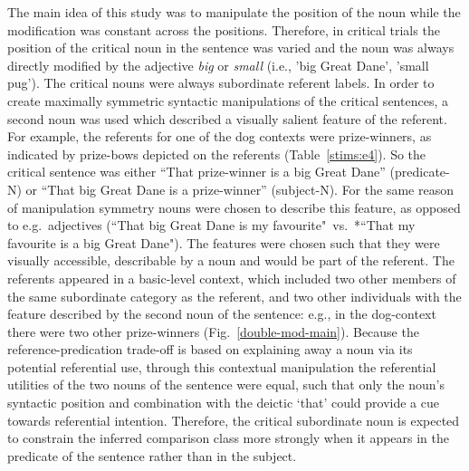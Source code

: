 The main idea of this study was to manipulate the position of the noun while the modification was constant across the positions. Therefore, in critical trials the position of the critical noun in the sentence was varied and the noun was always directly modified by the adjective \textit{big} or \textit{small} (i.e., 'big Great Dane', 'small pug'). The critical nouns were always subordinate referent labels. In order to create maximally symmetric syntactic manipulations of the critical sentences, a second noun was used which described a visually salient feature of the referent. For example, the referents for one of the dog contexts were prize-winners, as indicated by prize-bows depicted on the referents (Table~\ref{stims:e4}). So the critical sentence was either “That prize-winner is a big Great Dane” (predicate-N) or “That big Great Dane is a prize-winner” (subject-N). For the same reason of manipulation symmetry nouns were chosen to describe this feature, as opposed to e.g.~adjectives (``That big Great Dane is my favourite"~vs.~*``That my favourite is a big Great Dane"). The features were chosen such that they were visually accessible, describable by a noun and would be part of the referent.   
The referents appeared in a basic-level context, which included two other members of the same subordinate category as the referent, and two other individuals with the feature described by the second noun of the sentence: e.g., in the dog-context there were two other prize-winners (Fig.~\ref{double-mod-main}). Because the reference-predication trade-off is based on explaining away a noun via its potential referential use, through this contextual manipulation the referential utilities of the two nouns of the sentence were equal, such that only the noun’s syntactic position and combination with the deictic ‘that’ could provide a cue towards referential intention. Therefore, the critical subordinate noun is expected to constrain the inferred comparison class more strongly when it appears in the predicate of the sentence rather than in the subject. 

